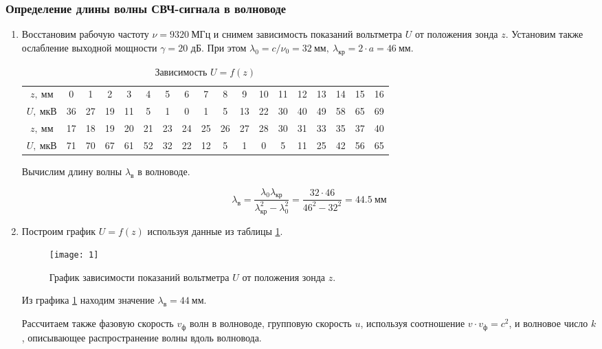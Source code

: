 \documentclass{lab}
\begin{document}
\subsubsection*{Определение длины волны СВЧ-сигнала в волноводе}
\begin{enumerate}
\item Восстановим рабочую частоту $\nu = 9320~МГц$ и снимем зависимость показаний вольтметра
$U$ от положения зонда $z$. Установим также ослабление выходной мощности $\gamma = 20$ дБ.
При этом $\lambda_0 = {c}/{\nu_0}=32~мм,~\lambda_{кр} = 2\cdot a = 46~мм.$
\begin{table}[H]
	\centering
	\begin{tabular}{|c|ccccccccccccccccc|}
		\hline
		$z,~мм$		&0	&1	&2	&3	&4	&5	&6	&7	&8	&9	&10	&11	&12	&13	&14	&15	&16	\\ %
		$U,~мкВ$	&36	&27	&19	&11	&5	&1	&0	&1	&5	&13	&22	&30	&40	&49	&58	&65	&69	\\ \hline \hline
		$z,~мм$		&17	&18	&19	&20	&21	&23	&24	&25	&26	&27	&28	&30	&31	&33	&35	&37	&40	\\ %
		$U,~мкВ$	&71	&70	&67	&61	&52	&32	&22	&12	&5	&1	&0	&5	&11	&25	&42	&56	&65	\\ \hline
	\end{tabular}
	\caption{\footnotesize 
		Зависимость $ U=f(z) $
	}
	\label{tab1}
\end{table}

Вычислим длину волны $ \lambda_в $ в волноводе.

\begin{equation}
\lambda_в = \dfrac{\lambda_0\lambda_{кр}}{\lambda_{кр}^2 - \lambda_0^2} = \dfrac{32 \cdot 46}{46^2 - 32^2} = 44.5~мм
\end{equation}

\newpage

\item Построим график $U = f(z)$ используя данные из таблицы \ref{tab1}.

\begin{figure}[H]
	\centering
	\texttt{[image: 1]}
	\caption{\footnotesize
		График зависимости показаний вольтметра $ U $ от положения зонда $ z $.
	}
	\label{graph1}
\end{figure}

Из графика \ref{graph1} находим значение $ \lambda_в = 44~мм. $

Рассчитаем также фазовую скорость $ v_ф $ волн в волноводе, групповую скорость $ u $, используя
соотношение $ v \cdot v_ф = c^2 $, и волновое число $ k $, описывающее распространение волны вдоль волновода.


\end{enumerate}
\end{document}
